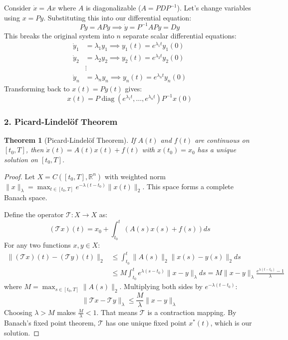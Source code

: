 \documentclass[12pt,a4paper,oneside]{article}
\theoremstyle{definition}
\theoremstyle{plain}
\newtheorem{theorem}{Theorem}[section]
\begin{document}
\vspace{0.1cm}
Consider $\dot{x} = Ax$ where $A$ is diagonalizable ($A = P D P^{-1}$). Let's change variables using $x = P y$. Substituting this into our differential equation:
\begin{equation}
    P \dot{y} = A P y \implies \dot{y} = P^{-1} A P y = D y
\end{equation}
This breaks the original system into $n$ separate scalar differential equations:
\begin{align}
    \dot{y}_1 &= \lambda_1 y_1 \implies y_1(t) = e^{\lambda_1 t} y_1(0) \nonumber \\
    \dot{y}_2 &= \lambda_2 y_2 \implies y_2(t) = e^{\lambda_2 t} y_2(0) \nonumber \\
    &\vdots \nonumber \\
    \dot{y}_n &= \lambda_n y_n \implies y_n(t) = e^{\lambda_n t} y_n(0)
\end{align}
Transforming back to $x(t) = P y(t)$ gives:
\begin{equation}
    x(t) = P \operatorname{diag}(e^{\lambda_1 t}, \dots, e^{\lambda_n t}) P^{-1} x(0)
\end{equation}

\subsubsection{2. Picard-Lindelöf Theorem}

\vspace{0.15cm}
\begin{theorem}[Picard-Lindelöf Theorem]
If $A(t)$ and $f(t)$ are continuous on $[t_0, T]$, then $\dot{x}(t) = A(t)x(t) + f(t)$ with $x(t_0) = x_0$ has a unique solution on $[t_0, T]$.
\end{theorem}

\begin{proof}
Let $X = C([t_0, T], \mathbb{R}^n)$ with weighted norm $\|x\|_\lambda = \max_{t \in [t_0, T]} e^{-\lambda(t - t_0)} \|x(t)\|_2$. This space forms a complete Banach space.

Define the operator $\mathcal{T}: X \to X$ as:
\begin{equation}
    (\mathcal{T}x)(t) = x_0 + \int_{t_0}^t \left( A(s) x(s) + f(s) \right) ds
\end{equation}
For any two functions $x, y \in X$:
\begin{align}
    \|(\mathcal{T}x)(t) - (\mathcal{T}y)(t)\|_2 &\le \int_{t_0}^t \|A(s)\|_2 \|x(s) - y(s)\|_2 ds \nonumber \\
    &\le M \int_{t_0}^t e^{\lambda(s - t_0)} \|x - y\|_\lambda ds = M \|x - y\|_\lambda \frac{e^{\lambda(t - t_0)} - 1}{\lambda}
\end{align}
where $M = \max_{s \in [t_0, T]} \|A(s)\|_2$. Multiplying both sides by $e^{-\lambda(t - t_0)}$:
\begin{equation}
    \|\mathcal{T}x - \mathcal{T}y\|_\lambda \le \frac{M}{\lambda} \|x - y\|_\lambda
\end{equation}
Choosing $\lambda > M$ makes $\frac{M}{\lambda} < 1$. That means $\mathcal{T}$ is a contraction mapping. By Banach's fixed point theorem, $\mathcal{T}$ has one unique fixed point $x^*(t)$, which is our solution.
\end{proof}
\end{document}
